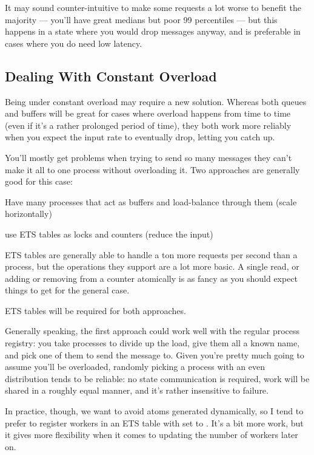 \documentclass[11pt, oneside]{book}   	%
\begin{document}
It may sound counter-intuitive to make some requests a lot worse to benefit the majority — you'll have great medians but poor 99 percentiles — but this happens in a state where you would drop messages anyway, and is preferable in cases where you do need low latency.

\subsection{Dealing With Constant Overload}

Being under constant overload may require a new solution. Whereas both queues and buffers will be great for cases where overload happens from time to time (even if it's a rather prolonged period of time), they both work more reliably when you expect the input rate to eventually drop, letting you catch up.

You'll mostly get problems when trying to send so many messages they can't make it all to one process without overloading it. Two approaches are generally good for this case:

\begin{itemize*}
	\item Have many processes that act as buffers and load-balance through them (scale horizontally)
	\item use ETS tables as locks and counters (reduce the input)
\end{itemize*}

ETS tables are generally able to handle a ton more requests per second than a process, but the operations they support are a lot more basic. A single read, or adding or removing from a counter atomically is as fancy as you should expect things to get for the general case.

ETS tables will be required for both approaches.

Generally speaking, the first approach could work well with the regular process registry: you take  processes to divide up the load, give them all a known name, and pick one of them to send the message to. Given you're pretty much going to assume you'll be overloaded, randomly picking a process with an even distribution tends to be reliable: no state communication is required, work will be shared in a roughly equal manner, and it's rather insensitive to failure.

In practice, though, we want to avoid atoms generated dynamically, so I tend to prefer to register workers in an ETS table with  set to . It's a bit more work, but it gives more flexibility when it comes to updating the number of workers later on.
\end{document}
